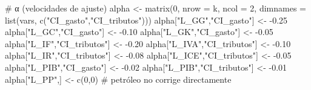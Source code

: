 \documentclass[
  spanish,
  letterpaper,
  DIV=11,
  numbers=noendperiod]{scrartcl}
\newenvironment{Shaded}{\begin{snugshade}}{\end{snugshade}}
\newcommand{\AttributeTok}[1]{\textcolor[rgb]{0.40,0.45,0.13}{#1}}
\newcommand{\CommentTok}[1]{\textcolor[rgb]{0.37,0.37,0.37}{#1}}
\newcommand{\DecValTok}[1]{\textcolor[rgb]{0.68,0.00,0.00}{#1}}
\newcommand{\FloatTok}[1]{\textcolor[rgb]{0.68,0.00,0.00}{#1}}
\newcommand{\FunctionTok}[1]{\textcolor[rgb]{0.28,0.35,0.67}{#1}}
\newcommand{\NormalTok}[1]{\textcolor[rgb]{0.00,0.23,0.31}{#1}}
\newcommand{\OtherTok}[1]{\textcolor[rgb]{0.00,0.23,0.31}{#1}}
\newcommand{\SpecialCharTok}[1]{\textcolor[rgb]{0.37,0.37,0.37}{#1}}
\newcommand{\StringTok}[1]{\textcolor[rgb]{0.13,0.47,0.30}{#1}}
\begin{document}
\begin{Shaded}
\begin{Highlighting}[]
\CommentTok{\# α (velocidades de ajuste)}
\NormalTok{alpha }\OtherTok{\textless{}{-}} \FunctionTok{matrix}\NormalTok{(}\DecValTok{0}\NormalTok{, }\AttributeTok{nrow =}\NormalTok{ k, }\AttributeTok{ncol =} \DecValTok{2}\NormalTok{, }\AttributeTok{dimnames =} \FunctionTok{list}\NormalTok{(vars, }\FunctionTok{c}\NormalTok{(}\StringTok{"CI\_gasto"}\NormalTok{,}\StringTok{"CI\_tributos"}\NormalTok{)))}
\NormalTok{alpha[}\StringTok{"L\_GG"}\NormalTok{,}\StringTok{"CI\_gasto"}\NormalTok{]  }\OtherTok{\textless{}{-}} \SpecialCharTok{{-}}\FloatTok{0.25}
\NormalTok{alpha[}\StringTok{"L\_GC"}\NormalTok{,}\StringTok{"CI\_gasto"}\NormalTok{]  }\OtherTok{\textless{}{-}} \SpecialCharTok{{-}}\FloatTok{0.10}
\NormalTok{alpha[}\StringTok{"L\_GK"}\NormalTok{,}\StringTok{"CI\_gasto"}\NormalTok{]  }\OtherTok{\textless{}{-}} \SpecialCharTok{{-}}\FloatTok{0.05}
\NormalTok{alpha[}\StringTok{"L\_IF"}\NormalTok{,}\StringTok{"CI\_tributos"}\NormalTok{]  }\OtherTok{\textless{}{-}} \SpecialCharTok{{-}}\FloatTok{0.20}
\NormalTok{alpha[}\StringTok{"L\_IVA"}\NormalTok{,}\StringTok{"CI\_tributos"}\NormalTok{] }\OtherTok{\textless{}{-}} \SpecialCharTok{{-}}\FloatTok{0.10}
\NormalTok{alpha[}\StringTok{"L\_IR"}\NormalTok{,}\StringTok{"CI\_tributos"}\NormalTok{]  }\OtherTok{\textless{}{-}} \SpecialCharTok{{-}}\FloatTok{0.08}
\NormalTok{alpha[}\StringTok{"L\_ICE"}\NormalTok{,}\StringTok{"CI\_tributos"}\NormalTok{] }\OtherTok{\textless{}{-}} \SpecialCharTok{{-}}\FloatTok{0.05}
\NormalTok{alpha[}\StringTok{"L\_PIB"}\NormalTok{,}\StringTok{"CI\_gasto"}\NormalTok{]    }\OtherTok{\textless{}{-}} \SpecialCharTok{{-}}\FloatTok{0.02}
\NormalTok{alpha[}\StringTok{"L\_PIB"}\NormalTok{,}\StringTok{"CI\_tributos"}\NormalTok{] }\OtherTok{\textless{}{-}} \SpecialCharTok{{-}}\FloatTok{0.01}
\NormalTok{alpha[}\StringTok{"L\_PP"}\NormalTok{,] }\OtherTok{\textless{}{-}} \FunctionTok{c}\NormalTok{(}\DecValTok{0}\NormalTok{,}\DecValTok{0}\NormalTok{)  }\CommentTok{\# petróleo no corrige directamente}


\end{Highlighting}
\end{Shaded}
\end{document}
